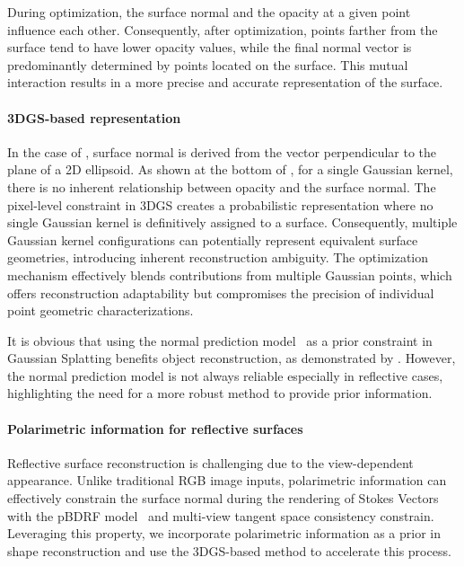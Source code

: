 During optimization, the surface normal and the opacity at a given point influence each other. Consequently, after optimization, points farther from the surface tend to have lower opacity values, while the final normal vector is predominantly determined by points located on the surface. This mutual interaction results in a more precise and accurate representation of the surface.
\vspace{-0.5em}
\paragraph{3DGS-based representation\quad}
In the case of \gs, surface normal is derived from the vector perpendicular to the plane of a 2D ellipsoid. As shown at the bottom of , for a single Gaussian kernel, there is no inherent relationship between opacity and the surface normal. 
The pixel-level constraint in 3DGS creates a probabilistic representation where no single Gaussian kernel is definitively assigned to a surface. Consequently, multiple Gaussian kernel configurations can potentially represent equivalent surface geometries, introducing inherent reconstruction ambiguity. 
The optimization mechanism effectively blends contributions from multiple Gaussian points, which offers reconstruction adaptability but compromises the precision of individual point geometric characterizations.



It is obvious that using the normal prediction model~\citep{eftekhar2021omnidata} as a prior constraint in Gaussian Splatting benefits object reconstruction, as demonstrated by \gs. However, the normal prediction model is not always reliable especially in reflective cases, highlighting the need for a more robust method to provide prior information.
\vspace{-0.8em}
\paragraph{Polarimetric information for reflective surfaces\quad}
Reflective surface reconstruction is challenging due to the view-dependent appearance. Unlike traditional RGB image inputs, polarimetric information can effectively constrain the surface normal during the rendering of Stokes Vectors with the pBDRF model~\citep{baek2018simultaneous} and multi-view tangent space consistency constrain.
Leveraging this property, we incorporate polarimetric information as a prior in shape reconstruction and use the 3DGS-based method to accelerate this process.


